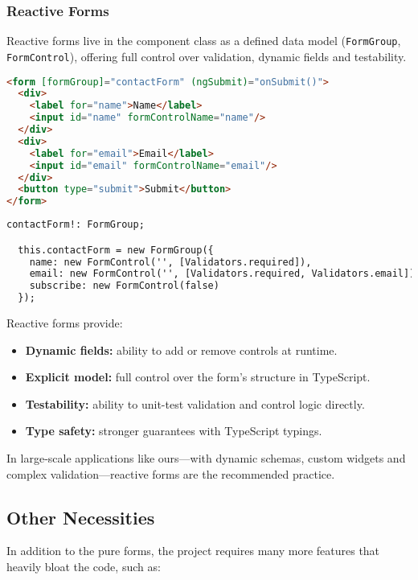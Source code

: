\subsubsection{Reactive Forms}

Reactive forms live in the component class as a defined data model (\texttt{FormGroup}, \texttt{FormControl}), offering
full control over validation, dynamic fields and testability.

\begin{lstlisting}[language=HTML,caption={Reactive Form HTML}, label={lst:reactiveHTML}]
<form [formGroup]="contactForm" (ngSubmit)="onSubmit()">
  <div>
    <label for="name">Name</label>
    <input id="name" formControlName="name"/>
  </div>
  <div>
    <label for="email">Email</label>
    <input id="email" formControlName="email"/>
  </div>
  <button type="submit">Submit</button>
</form>
\end{lstlisting}

\begin{lstlisting}[language=HTML,caption={Reactive Form TS}, label={lst:reactiveTS}]
  contactForm!: FormGroup;

  this.contactForm = new FormGroup({
    name: new FormControl('', [Validators.required]),
    email: new FormControl('', [Validators.required, Validators.email]),
    subscribe: new FormControl(false)
  });
\end{lstlisting}

Reactive forms provide:
\begin{itemize}
  \item \textbf{Dynamic fields:} ability to add or remove controls at runtime.
  \item \textbf{Explicit model:} full control over the form’s structure in TypeScript.
  \item \textbf{Testability:} ability to unit-test validation and control logic directly.
  \item \textbf{Type safety:} stronger guarantees with TypeScript typings.
\end{itemize}

In large‐scale applications like ours—with dynamic schemas, custom widgets and complex validation—reactive forms are
the recommended practice.

\subsection{Other Necessities}
In addition to the pure forms, the project requires many more features that heavily bloat the code, such as:

